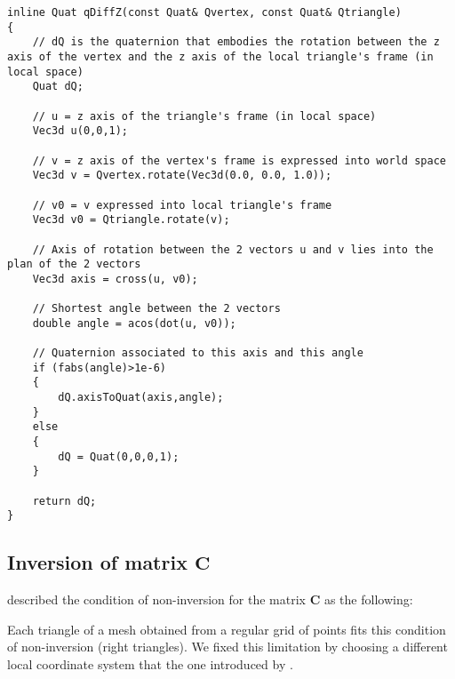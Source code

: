 \begin{lstlisting}[caption={Method used to compute the rotation of the z axis between the frames embodied by two quaternions},label=chap9:qDiffZ]
inline Quat qDiffZ(const Quat& Qvertex, const Quat& Qtriangle)
{
    // dQ is the quaternion that embodies the rotation between the z axis of the vertex and the z axis of the local triangle's frame (in local space)
    Quat dQ;

    // u = z axis of the triangle's frame (in local space)
    Vec3d u(0,0,1);

    // v = z axis of the vertex's frame is expressed into world space
    Vec3d v = Qvertex.rotate(Vec3d(0.0, 0.0, 1.0));
    
    // v0 = v expressed into local triangle's frame
    Vec3d v0 = Qtriangle.rotate(v);

    // Axis of rotation between the 2 vectors u and v lies into the plan of the 2 vectors
    Vec3d axis = cross(u, v0);
    
    // Shortest angle between the 2 vectors
    double angle = acos(dot(u, v0));

    // Quaternion associated to this axis and this angle
    if (fabs(angle)>1e-6)
    {
        dQ.axisToQuat(axis,angle);
    }
    else
    {
        dQ = Quat(0,0,0,1);
    }

    return dQ;
}
\end{lstlisting}


	\subsection{Inversion of matrix $ \mathbf{C} $}
\cite{Przemieniecki85} described the condition of non-inversion for the matrix $\mathbf{C}$ as the following:

Each triangle of a mesh obtained from a regular grid of points fits this condition of non-inversion (right triangles). We fixed this limitation by choosing a different local coordinate system that the one introduced by \citeauthor{Przemieniecki85}. 



